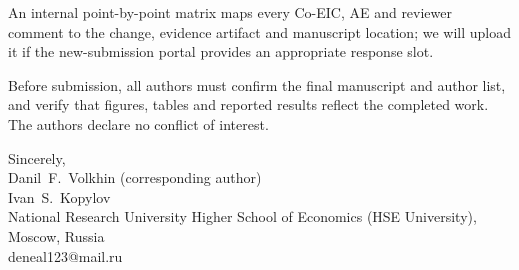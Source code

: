 \documentclass[11pt,a4paper]{article}
\begin{document}
An internal point-by-point matrix maps every Co-EIC, AE and reviewer comment to the change, evidence
artifact and manuscript location; we will upload it if the new-submission portal provides an
appropriate response slot.

\vspace{3mm}
\noindent
Before submission, all authors must confirm the final manuscript and author list, and verify that
figures, tables and reported results reflect the completed work. The authors declare no conflict of interest.

\vspace{6mm}
\noindent
Sincerely,\\
Danil~F.~Volkhin (corresponding author)\\
Ivan~S.~Kopylov\\
National Research University Higher School of Economics (HSE University), Moscow, Russia\\
deneal123@mail.ru
\end{document}

